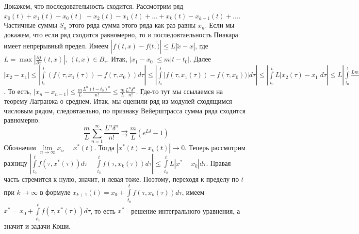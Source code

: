 Докажем, что последовательность сходится. Рассмотрим ряд $x_0(t)+x_1(t)-x_0(t)\
+x_2(t)-x_1(t)+...+x_k(t)-x_{k-1}(t)+...$. Частичные суммы $S_n$ 
этого ряда сумма этого ряда как раз равны $x_n$. Если мы докажем, что если
ряд сходится равномерно, то и последовтаельность Пиакара имеет непрерывный 
предел. 
Имеем $|f(t,x)-f(t,\tilde)|\leqslant L|\tilde x-x|$, где 
$L=\max\left|\frac{\partial f}{\partial x}(t,x)\right|,~(t,x)\in B_r$. 
Итак, $|x_1-x_0|\leqslant m|t-t_0|$. Далее
$|x_2-x_1|\leqslant \left| \int\limits_{t_0}^{t}(f(\tau,x_1(\tau))-
f(\tau,x_0))d\tau \right|\leqslant 
\left| \int\limits_{t_0}^{t}\left|f(\tau,x_1(\tau))-f(\tau,x_0))\right| 
d\tau \right| \leqslant 
\left| \int\limits_{t_0}^{t}L|x_2(\tau)-x_1|d\tau\right|\leqslant 
L\left| \int\limits_{t_0}^{t}\frac{Lm|x_2(\tau)-x_1|^2}{2}d\tau\right|
\leqslant \frac{L^3m|t-t_0|^3}{6L}$. То есть, 
$|x_n-x_{n-1}|\leqslant \frac{m}{L} \frac{L^n(t-t_0)^n}{n!}\leqslant 
\frac{m}{L}\frac{L^n\delta^n}{n!}$.
Где-то тут мы ссылаемся на теорему Лагранжа о среднем. 
Итак, мы оценили ряд из модулей сходящимся
числовым рядом, следовтаельно, по признаку Вейерштрасса сумма ряда сходится
равномерно: 
$$\frac{m}{L}\sum\limits_{n=1}^{\infty}\frac{L^n\delta^n}{n!}\rightrightarrows
\frac{m}{L}\left( e^{L\delta}-1 \right)$$
Обозначим $\lim\limits_{n \to \infty} x_n=x^*(t)$. 
Тогда $|x^*(t)-x_k(t)|\to 0$. Теперь рассмотрим разницу
$\left| \int\limits_{t_0}^{t} f(\tau,x^*(\tau))d\tau-\int\limits_{t_0}^{t}
f(\tau,x_k(\tau))d\tau\right|\leqslant \int\limits_{t_0}^{t}L|x^*-x_k|d\tau$.
Правая часть стремится к нулю, значит, и левая тоже. Поэтому, переходя к
пределу  по $t$ при  $k\to \infty$ в формуле 
$x_{k+1}(t)=x_0+\int\limits_{t_0}^{t}f(\tau,x_k(\tau))d\tau$, имеем
$x^*=x_0+\int\limits_{t_0}^{t}f(\tau,x^*(\tau))d\tau$, то есть $x^*$ - 
решение интегрального уравнения, а значит и задачи Коши. 

